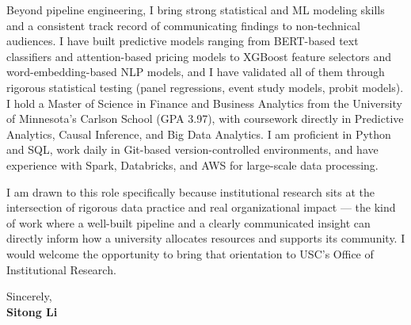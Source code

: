 \documentclass[12pt]{article}
\begin{document}
Beyond pipeline engineering, I bring strong statistical and ML modeling skills and a consistent track record of communicating findings to non-technical audiences. I have built predictive models ranging from BERT-based text classifiers and attention-based pricing models to XGBoost feature selectors and word-embedding-based NLP models, and I have validated all of them through rigorous statistical testing (panel regressions, event study models, probit models). I hold a Master of Science in Finance and Business Analytics from the University of Minnesota's Carlson School (GPA 3.97), with coursework directly in Predictive Analytics, Causal Inference, and Big Data Analytics. I am proficient in Python and SQL, work daily in Git-based version-controlled environments, and have experience with Spark, Databricks, and AWS for large-scale data processing.

I am drawn to this role specifically because institutional research sits at the intersection of rigorous data practice and real organizational impact --- the kind of work where a well-built pipeline and a clearly communicated insight can directly inform how a university allocates resources and supports its community. I would welcome the opportunity to bring that orientation to USC's Office of Institutional Research.

\vspace{1em}

\noindent Sincerely,\\[0.5em]
\textbf{Sitong Li}
\end{document}
